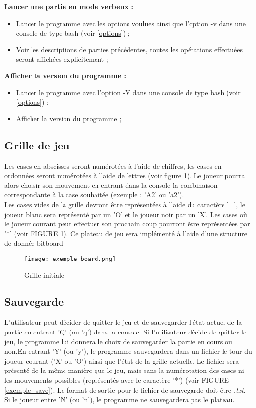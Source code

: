 \documentclass[10pt,a4paper]{article}
\begin{document}
\textbf{Lancer une partie en mode verbeux :}
\begin{itemize}
\item Lancer le programme avec les options voulues ainsi que l'option -v dans une console de type bash (voir \ref{options}) ;
\item Voir les descriptions de parties précédentes, toutes les opérations effectuées seront affichées explicitement ;\\
\end{itemize}

\textbf{Afficher la version du programme :}
\begin{itemize}
\item Lancer le programme avec l'option -V dans une console de type bash (voir \ref{options}) ;
\item Afficher la version du programme ;
\end{itemize}

\subsection{Grille de jeu}
\label{board}

Les cases en abscisses seront numérotées à l'aide de chiffres, les cases en ordonnées seront numérotées à l'aide de lettres (voir figure \ref{exemple_board}). Le joueur pourra alors choisir son mouvement en entrant dans la console la combinaison correspondante à la case souhaitée (exemple : 'A2' ou 'a2').\\

Les cases vides de la grille devront être représentées à l'aide du caractère '\_', le joueur blanc sera représenté par un 'O' et le joueur noir par un 'X'. Les cases où le joueur courant peut effectuer son prochain coup pourront être représentées par '*' (voir FIGURE \ref{exemple_board}). Ce plateau de jeu sera implémenté à l'aide d'une structure de donnée bitboard.

\begin{figure}[H]
\centering
\texttt{[image: exemple\_board.png]}
\label{exemple_board}
\caption{Grille initiale}
\end{figure}

\subsection{Sauvegarde}
\label{save}

L'utilisateur peut décider de quitter le jeu et de sauvegarder l'état actuel de la partie en entrant 'Q' (ou 'q') dans la console. Si l'utilisateur décide de quitter le jeu, le programme lui donnera le choix de sauvegarder la partie en cours ou non.En entrant 'Y' (ou 'y'), le programme sauvegardera dans un fichier le tour du joueur courant ('X' ou 'O') ainsi que l'état de la grille actuelle. Le fichier sera présenté de la même manière que le jeu, mais sans la numérotation des cases ni les mouvements possibles (représentés avec le caractère '*') (voir FIGURE \ref{exemple_save}). Le format de sortie pour le fichier de sauvegarde doit être \textit{.txt}. Si le joueur entre 'N' (ou 'n'), le programme ne sauvegardera pas le plateau.
\end{document}
